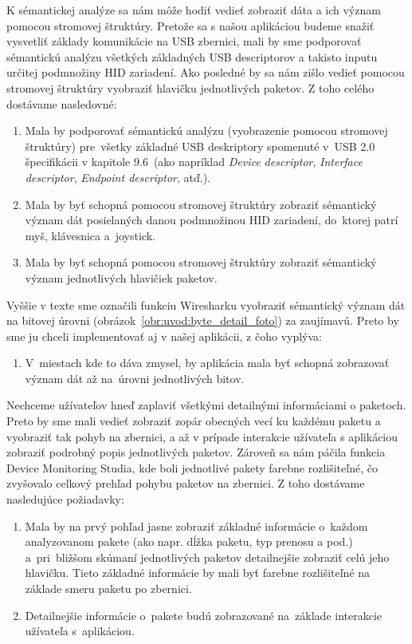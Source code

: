 K sémantickej analýze sa nám môže hodiť vedieť zobraziť dáta a ich význam pomocou stromovej štruktúry. Pretože sa s našou aplikáciou budeme snažiť vysvetliť základy komunikácie na USB zbernici, mali by sme podporovať sémantickú analýzu všetkých základných USB descriptorov a takisto inputu určitej podmnožiny HID zariadení. Ako posledné by sa nám zišlo vedieť pomocou stromovej štruktúry vyobraziť hlavičku jednotlivých paketov. Z toho celého dostávame nasledovné:
\begin{enumerate}[label=\textbf{P\arabic*},resume]
	\item \label{uvod:poz:deskriptory} Mala by podporovať sémantickú analýzu (vyobrazenie pomocou stromovej štruktúry) pre~všetky základné USB deskriptory spomenuté v~USB 2.0 špecifikácii\cite{usbdoc} v kapitole 9.6~(ako napríklad \textit{Device descriptor}, \textit{Interface descriptor}, \textit{Endpoint descriptor}, atď.).
	\item \label{uvod:poz:hid_analyza} Mala by byť schopná pomocou stromovej štruktúry zobraziť sémantický význam dát posielaných danou podmnožinou HID zariadení, do~ktorej patrí myš, klávesnica a~joystick.
	\item \label{uvod:poz:paket_hlavicka} Mala by byť schopná pomocou stromovej štruktúry zobraziť sémantický význam jednotlivých hlavičiek paketov.
\end{enumerate}

Vyššie v texte sme označili funkciu Wiresharku vyobraziť sémantický význam dát na bitovej úrovni (obrázok~\ref{obr:uvod:byte_detail_foto}) za zaujímavú. Preto by sme ju chceli implementovať aj v našej aplikácii, z čoho vyplýva:
\begin{enumerate}[label=\textbf{P\arabic*},resume]
\item \label{uvod:poz:show_bits} V~miestach kde to dáva zmysel, by aplikácia mala byť schopná zobrazovať význam dát až na~úrovni jednotlivých bitov.
\end{enumerate}

Nechceme užívateľov hneď zaplaviť všetkými detailnými informáciami o paketoch. Preto by sme mali vedieť zobraziť zopár obecných vecí ku každému paketu a vyobraziť tak pohyb na zbernici, a až v prípade interakcie užívateľa s aplikáciou zobraziť podrobný popis jednotlivých paketov. Zároveň sa nám páčila funkcia Device Monitoring Studia, kde boli jednotlivé pakety farebne rozlišiteľné, čo zvyšovalo celkový prehľad pohybu paketov na zbernici. Z toho dostávame nasledujúce požiadavky:
\begin{enumerate}[label=\textbf{P\arabic*},resume]
	\item \label{uvod:poz:zobrazenie_paketov} Mala by na prvý pohľad jasne zobraziť základné informácie o~každom analyzovanom pakete (ako napr. dĺžka paketu, typ prenosu a pod.) a~pri~bližšom skúmaní jednotlivých paketov detailnejšie zobraziť celú jeho hlavičku. Tieto základné informácie by mali byť farebne rozlišiteľné na základe smeru paketu po zbernici.
	\item \label{uvod:poz:paket_detail} Detailnejšie informácie o~pakete budú zobrazované na~základe interakcie užívateľa s~aplikáciou.
\end{enumerate}

